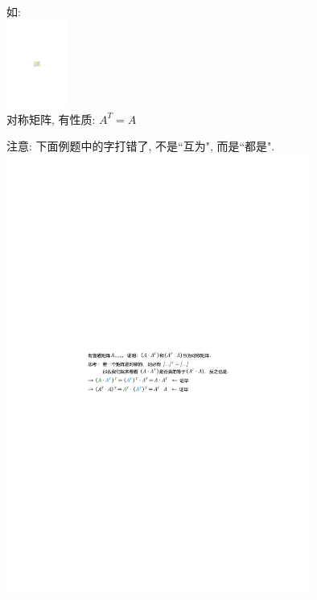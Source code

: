 \documentclass[UTF8]{ctexart}
\begin{document}
如:\\
\includegraphics[width=0.15\textwidth]{img/0020.pdf}\\

对称矩阵, 有性质: $A^T = A$ \\



\begin{myEnvSample}
	注意: 下面例题中的字打错了, 不是``互为", 而是``都是". \\
	\includegraphics[width=0.75\textwidth]{img/0021.pdf}
\end{myEnvSample}
\end{document}
